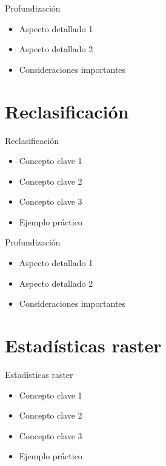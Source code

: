 \documentclass[10pt]{beamer}
\begin{document}
\begin{frame}{Profundización}
    \begin{itemize}
        \item Aspecto detallado 1
        \item Aspecto detallado 2
        \item Consideraciones importantes
    \end{itemize}
\end{frame}

\section{Reclasificación}

\begin{frame}{Reclasificación}
    \begin{itemize}
        \item Concepto clave 1
        \item Concepto clave 2
        \item Concepto clave 3
        \item Ejemplo práctico
    \end{itemize}
\end{frame}

\begin{frame}{Profundización}
    \begin{itemize}
        \item Aspecto detallado 1
        \item Aspecto detallado 2
        \item Consideraciones importantes
    \end{itemize}
\end{frame}

\section{Estadísticas raster}

\begin{frame}{Estadísticas raster}
    \begin{itemize}
        \item Concepto clave 1
        \item Concepto clave 2
        \item Concepto clave 3
        \item Ejemplo práctico
    \end{itemize}
\end{frame}
\end{document}
